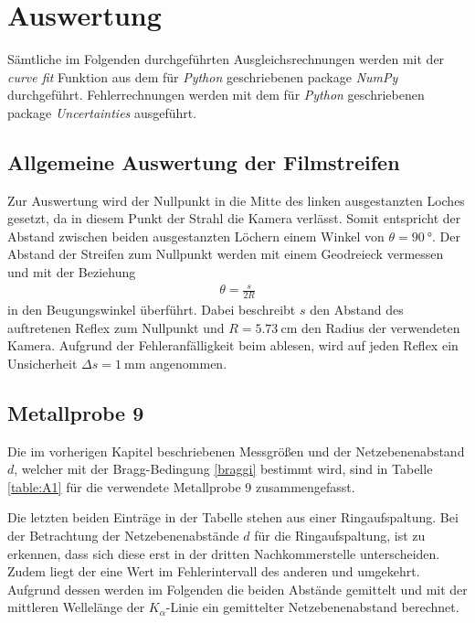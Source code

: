\section{Auswertung}
\label{sec:Auswertung}
Sämtliche im Folgenden durchgeführten Ausgleichsrechnungen werden mit der \emph{curve fit} Funktion aus dem für \emph{Python} geschriebenen package \emph{NumPy}\cite{scipy} durchgeführt. Fehlerrechnungen werden mit dem für \emph{Python} geschriebenen package \emph{Uncertainties}\cite{uncertainties} ausgeführt.

\subsection{Allgemeine Auswertung der Filmstreifen}
\label{sec:allgemein}
Zur Auswertung wird der Nullpunkt in die Mitte des linken ausgestanzten Loches gesetzt, da in diesem Punkt der Strahl die Kamera verlässt. Somit entspricht der Abstand zwischen beiden ausgestanzten Löchern einem Winkel von $\theta=\SI{90}{\degree}$. Der Abstand der Streifen zum Nullpunkt werden mit einem Geodreieck vermessen und mit der Beziehung
\begin{align}
	\theta=\frac{s}{2R}
\end{align}
in den Beugungswinkel überführt. Dabei beschreibt $s$ den Abstand des auftretenen Reflex zum Nullpunkt und $R=\SI{5.73}{\centi\meter}$ den Radius der verwendeten Kamera.  Aufgrund der Fehleranfälligkeit beim ablesen, wird auf jeden Reflex ein Unsicherheit  $\Delta s=\SI{1}{\milli\meter}$ angenommen.

\subsection{Metallprobe 9}
Die im vorherigen Kapitel beschriebenen Messgrößen und der Netzebenenabstand $d$, welcher mit der Bragg-Bedingung \eqref{braggi} bestimmt wird, sind in Tabelle \ref{table:A1} für die verwendete Metallprobe 9 zusammengefasst.

Die letzten beiden Einträge in der Tabelle stehen aus einer Ringaufspaltung. Bei der Betrachtung der Netzebenenabstände $d$ für die Ringaufspaltung, ist zu erkennen, dass sich diese erst in der dritten Nachkommerstelle unterscheiden. Zudem liegt der eine Wert im Fehlerintervall des anderen und umgekehrt. Aufgrund dessen werden im Folgenden die beiden Abstände gemittelt und mit der mittleren Wellelänge der $K_\alpha$-Linie ein gemittelter Netzebenenabstand berechnet. \\

